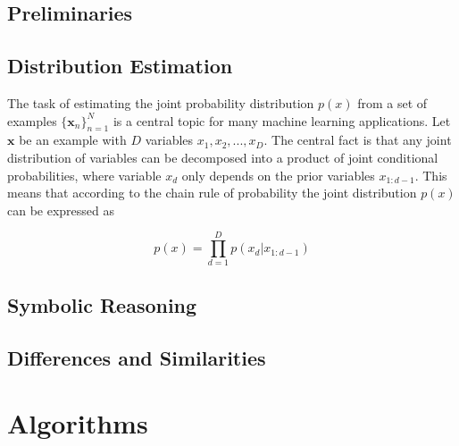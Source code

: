 \documentclass[11pt,titlepage,oneside,openany]{book}
\newtheorem{definition}{Definition}
\newtheorem{proposition}{Proposition}
\begin{document}
\section{Preliminaries}
\label{sec:prelim}


\section{Distribution Estimation}
\label{sec:good}
The task of estimating the joint probability distribution $p(x)$ from a set of examples $\{\pmb{x}_n\}^N_{n=1}$ is a central topic for many machine learning applications. Let $\pmb{x}$ be an example with $D$ variables $x_1, x_2,...,x_D$. The central fact is that any joint distribution of variables can be decomposed into a product of joint conditional probabilities, where variable $x_d$ only depends on the prior variables $x_{1:d-1}$. This means that according to the chain rule of probability the joint distribution $p(x)$ can be expressed as

\begin{equation}
	\label{func:chain}
	p(x) = \prod_{d=1}^{D} p(x_d|x_{1:d-1})
\end{equation}

\section{Symbolic Reasoning}
\label{sec:evil}

\section{Differences and Similarities}
\label{sec:diff}


\chapter{Algorithms}
\label{cha:alg}
\end{document}
